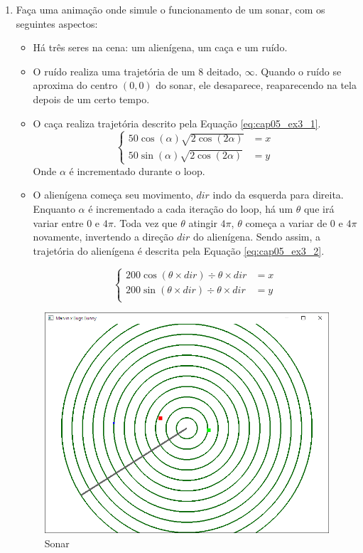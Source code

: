 \begin{enumerate}
\item
	Faça uma animação onde simule o funcionamento de um sonar, com os seguintes aspectos:
	\begin{itemize}
  	\item Há três seres na cena: um alienígena, um caça e um ruído.
  	\item O ruído realiza uma trajetória de um 8 deitado, $\infty$. Quando o ruído se aproxima do centro $(0,0)$ do sonar, ele desaparece, reaparecendo na tela depois de um certo tempo.
  	\item O caça realiza trajetória descrito pela Equação \ref{eq:cap05_ex3_1}.
  	\begin{equation}\label{eq:cap05_ex3_1}
  	\left\{\begin{matrix}
	 50 \cos(\alpha)\sqrt{2\cos(2\alpha)} & = x \\ 
	 50 \sin(\alpha)\sqrt{2\cos(2\alpha)} & = y
	\end{matrix}\right.
  	\end{equation}
  	Onde $\alpha$ é incrementado durante o loop.
  	\item O alienígena começa seu movimento, $dir$ indo da esquerda para direita. Enquanto $\alpha$ é incrementado a cada iteração do loop, há um $\theta$ que irá variar entre $0$ e $4\pi$. Toda vez que $\theta$ atingir $4\pi$, $\theta$ começa a variar de $0$ e $4\pi$ novamente, invertendo a direção $dir$ do alienígena.
  	Sendo assim, a trajetória do alienígena é descrita pela Equação \ref{eq:cap05_ex3_2}.
  	
  	\begin{equation}\label{eq:cap05_ex3_2}
  	\left\{\begin{matrix}
	 200 \cos(\theta \times dir)\div \theta\times dir & = x \\ 
	 200 \sin(\theta \times dir)\div \theta\times dir & = y \\ 
	\end{matrix}\right.
  	\end{equation}

  \end{itemize}
\label{ex:cap05_ex3}

  \begin{figure}[ht]
    \centerline{\includegraphics[width=.5\textwidth]{img/cap5_ex20.png}}
    \caption{Sonar}
    \label{fig:cap04_ex1}
  \end{figure}
\end{enumerate}

